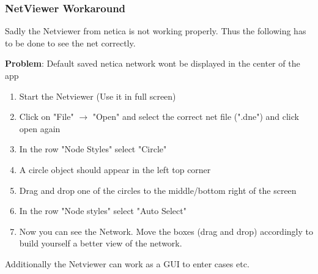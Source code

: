 \documentclass[12pt]{scrartcl}
\begin{document}
\subsubsection{NetViewer Workaround}
Sadly the Netviewer from netica is not working properly. Thus the following has to be done to see the net correctly.

\textbf{Problem}: Default saved netica network wont be displayed in the center of the app

\begin{enumerate}
    \item Start the Netviewer (Use it in full screen)
    \item Click on "File" $\rightarrow$ "Open" and select the correct net file (".dne") and click open again
    \item In the row "Node Styles" select "Circle"
    \item A circle object should appear in the left top corner
    \item Drag and drop one of the circles to the middle/bottom right of the screen
    \item In the row "Node styles" select "Auto Select"
    \item Now you can see the Network. Move the boxes (drag and drop) accordingly to build yourself a better view of the network.
\end{enumerate}


Additionally the Netviewer can work as a GUI to enter cases etc.
\end{document}
